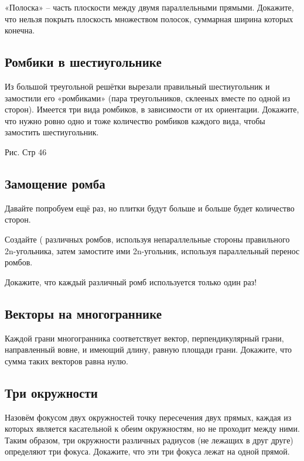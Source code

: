 «Полоска» -- часть плоскости между двумя параллельными прямыми.
Докажите, что нельзя покрыть плоскость множеством полосок, суммарная ширина которых конечна.




\subsection*{Ромбики в шестиугольнике}%


Из большой треугольной решётки вырезали правильный шестиугольник и замостили его «ромбиками» (пара треугольников, склееных вместе по одной из сторон).
Имеется три вида ромбиков, в зависимости от их ориентации.
Докажите, что нужно ровно одно и тоже количество ромбиков каждого вида, чтобы замостить шестиугольник.


                                         Рис. Стр 46
\subsection*{Замощение ромба}%


Давайте попробуем ещё раз, но плитки будут больше и больше будет количество сторон.



  Создайте ( различных ромбов, используя непараллельные стороны правильного 2n-угольника, затем замостите ими 2n-угольник, используя параллельный перенос ромбов.

Докажите, что каждый различный ромб используется только один раз!




\subsection*{Векторы на многограннике}%


Каждой грани многогранника соответствует вектор, перпендикулярный грани, направленный вовне, и имеющий длину, равную площади грани.
Докажите, что сумма таких векторов равна нулю.




\subsection*{Три окружности}%


Назовём фокусом  двух  окружностей  точку пересечения двух прямых, каждая из которых является касательной к обеим окружностям, но не проходит между ними.
Таким образом, три окружности различных радиусов (не лежащих в друг друге)
определяют три фокуса.
Докажите, что эти три фокуса лежат на одной прямой.


